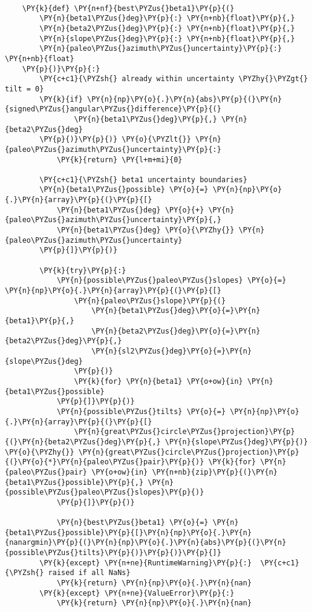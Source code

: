 \begin{tcolorbox}[breakable, size=fbox, boxrule=1pt, pad at break*=1mm,colback=cellbackground, colframe=cellborder]
\begin{Verbatim}[commandchars=\\\{\}]
    
    \PY{k}{def} \PY{n+nf}{best\PYZus{}beta1}\PY{p}{(}
        \PY{n}{beta1\PYZus{}deg}\PY{p}{:} \PY{n+nb}{float}\PY{p}{,}
        \PY{n}{beta2\PYZus{}deg}\PY{p}{:} \PY{n+nb}{float}\PY{p}{,}
        \PY{n}{slope\PYZus{}deg}\PY{p}{:} \PY{n+nb}{float}\PY{p}{,}
        \PY{n}{paleo\PYZus{}azimuth\PYZus{}uncertainty}\PY{p}{:} \PY{n+nb}{float}
    \PY{p}{)}\PY{p}{:}
        \PY{c+c1}{\PYZsh{} already within uncertainty \PYZhy{}\PYZgt{} tilt = 0}
        \PY{k}{if} \PY{n}{np}\PY{o}{.}\PY{n}{abs}\PY{p}{(}\PY{n}{signed\PYZus{}angular\PYZus{}difference}\PY{p}{(}
                \PY{n}{beta1\PYZus{}deg}\PY{p}{,} \PY{n}{beta2\PYZus{}deg}
        \PY{p}{)}\PY{p}{)} \PY{o}{\PYZlt{}} \PY{n}{paleo\PYZus{}azimuth\PYZus{}uncertainty}\PY{p}{:}
            \PY{k}{return} \PY{l+m+mi}{0}
    
        \PY{c+c1}{\PYZsh{} beta1 uncertainty boundaries}
        \PY{n}{beta1\PYZus{}possible} \PY{o}{=} \PY{n}{np}\PY{o}{.}\PY{n}{array}\PY{p}{(}\PY{p}{[}
            \PY{n}{beta1\PYZus{}deg} \PY{o}{+} \PY{n}{paleo\PYZus{}azimuth\PYZus{}uncertainty}\PY{p}{,}
            \PY{n}{beta1\PYZus{}deg} \PY{o}{\PYZhy{}} \PY{n}{paleo\PYZus{}azimuth\PYZus{}uncertainty}
        \PY{p}{]}\PY{p}{)}
    
        \PY{k}{try}\PY{p}{:}
            \PY{n}{possible\PYZus{}paleo\PYZus{}slopes} \PY{o}{=} \PY{n}{np}\PY{o}{.}\PY{n}{array}\PY{p}{(}\PY{p}{[}
                \PY{n}{paleo\PYZus{}slope}\PY{p}{(}
                    \PY{n}{beta1\PYZus{}deg}\PY{o}{=}\PY{n}{beta1}\PY{p}{,}
                    \PY{n}{beta2\PYZus{}deg}\PY{o}{=}\PY{n}{beta2\PYZus{}deg}\PY{p}{,}
                    \PY{n}{sl2\PYZus{}deg}\PY{o}{=}\PY{n}{slope\PYZus{}deg}
                \PY{p}{)}
                \PY{k}{for} \PY{n}{beta1} \PY{o+ow}{in} \PY{n}{beta1\PYZus{}possible}
            \PY{p}{]}\PY{p}{)}
            \PY{n}{possible\PYZus{}tilts} \PY{o}{=} \PY{n}{np}\PY{o}{.}\PY{n}{array}\PY{p}{(}\PY{p}{[}
                \PY{n}{great\PYZus{}circle\PYZus{}projection}\PY{p}{(}\PY{n}{beta2\PYZus{}deg}\PY{p}{,} \PY{n}{slope\PYZus{}deg}\PY{p}{)} \PY{o}{\PYZhy{}} \PY{n}{great\PYZus{}circle\PYZus{}projection}\PY{p}{(}\PY{o}{*}\PY{n}{paleo\PYZus{}pair}\PY{p}{)} \PY{k}{for} \PY{n}{paleo\PYZus{}pair} \PY{o+ow}{in} \PY{n+nb}{zip}\PY{p}{(}\PY{n}{beta1\PYZus{}possible}\PY{p}{,} \PY{n}{possible\PYZus{}paleo\PYZus{}slopes}\PY{p}{)}
            \PY{p}{]}\PY{p}{)}
    
            \PY{n}{best\PYZus{}beta1} \PY{o}{=} \PY{n}{beta1\PYZus{}possible}\PY{p}{[}\PY{n}{np}\PY{o}{.}\PY{n}{nanargmin}\PY{p}{(}\PY{n}{np}\PY{o}{.}\PY{n}{abs}\PY{p}{(}\PY{n}{possible\PYZus{}tilts}\PY{p}{)}\PY{p}{)}\PY{p}{]}
        \PY{k}{except} \PY{n+ne}{RuntimeWarning}\PY{p}{:}  \PY{c+c1}{\PYZsh{} raised if all NaNs}
            \PY{k}{return} \PY{n}{np}\PY{o}{.}\PY{n}{nan}
        \PY{k}{except} \PY{n+ne}{ValueError}\PY{p}{:}
            \PY{k}{return} \PY{n}{np}\PY{o}{.}\PY{n}{nan}
    

\end{Verbatim}
\end{tcolorbox}
